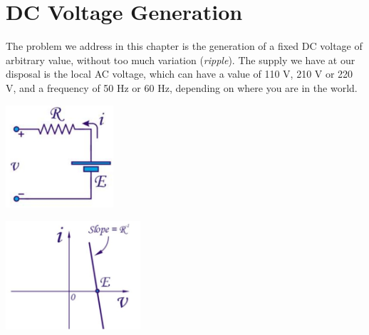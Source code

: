 \chapter{DC Voltage Generation}
\label{ch:references}

The problem we address in this chapter is the generation of a fixed DC voltage of arbitrary value, without too much variation (\emph{ripple}). The supply we have at our disposal is the local AC voltage, which can have a value of 110 V, 210 V or 220 V, and a frequency of 50 Hz or 60 Hz, depending on where you are in the world.

\begin{minipage}{.5\textwidth}
	\centering
	\includegraphics[width=4cm]{figures/ch12/dc_source1.jpg}
	\label{fig:dc_source1}
\end{minipage}%
\begin{minipage}{.5\textwidth}
	\centering
	\includegraphics[width=5cm]{figures/ch12/dc_source2.jpg}
	\label{fig:dc_source2}
\end{minipage}

